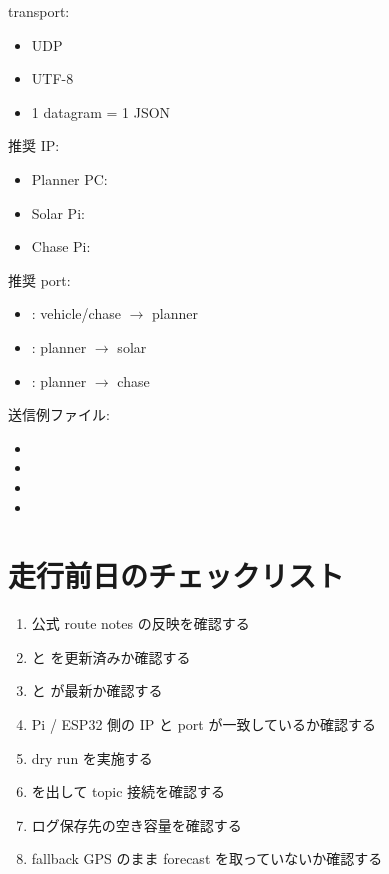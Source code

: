 \documentclass[a4paper,11pt]{article}
\begin{document}
transport:

\begin{itemize}
  \item UDP
  \item UTF-8
  \item 1 datagram = 1 JSON
\end{itemize}

推奨 IP:

\begin{itemize}
  \item Planner PC: 
  \item Solar Pi: 
  \item Chase Pi: 
\end{itemize}

推奨 port:

\begin{itemize}
  \item {}: vehicle/chase $\rightarrow$ planner
  \item {}: planner $\rightarrow$ solar
  \item {}: planner $\rightarrow$ chase
\end{itemize}

送信例ファイル:

\begin{itemize}
  \item {}
  \item {}
  \item {}
  \item {}
\end{itemize}

\section{走行前日のチェックリスト}

\begin{enumerate}
  \item 公式 route notes の反映を確認する
  \item {} と  を更新済みか確認する
  \item {} と  が最新か確認する
  \item Pi / ESP32 側の IP と port が一致しているか確認する
  \item {} dry run を実施する
  \item {} を出して topic 接続を確認する
  \item ログ保存先の空き容量を確認する
  \item fallback GPS のまま forecast を取っていないか確認する
\end{enumerate}
\end{document}
